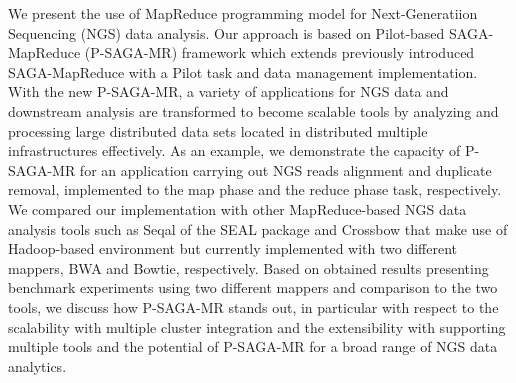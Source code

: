 \documentclass{sig-alternate}
\begin{document}
\maketitle
\begin{abstract} 



 
\end{abstract}

We present the use of MapReduce programming model for Next-Generatiion Sequencing (NGS) data analysis.  Our approach is based on Pilot-based SAGA-MapReduce (P-SAGA-MR) framework which extends previously introduced SAGA-MapReduce with a Pilot task and data management implementation.  With the new P-SAGA-MR, a variety of applications for NGS data and downstream analysis are transformed to become scalable tools by analyzing and processing large distributed data sets located in distributed multiple infrastructures effectively.   As an example, we demonstrate the capacity of P-SAGA-MR for an application carrying out NGS reads alignment and duplicate removal, implemented to the map phase and the reduce phase task, respectively.  We compared our implementation with other MapReduce-based NGS data analysis tools such as Seqal of the SEAL package and Crossbow that make use of Hadoop-based environment but currently implemented with two different mappers, BWA and Bowtie, respectively.  Based on obtained results presenting benchmark experiments using two different mappers and comparison to the two tools, we discuss how P-SAGA-MR stands out, in particular with respect to the scalability with multiple cluster integration and the extensibility with supporting multiple tools and the potential of P-SAGA-MR for a broad range of NGS data analytics. 


 




\end{document}
